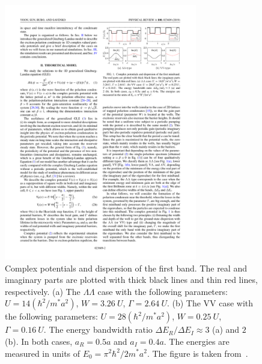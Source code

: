 %
%
%
\begin{figure}[ht]
\centering
\includegraphics[width=0.75\textwidth]{Fig/Ch4/fig1.pdf}
\caption[Setup of 1D complex potentials and corresponding eigenvalues]{Complex potentials and dispersion of the first band. The real and imaginary parts are plotted with thick black lines and thin red lines, respectively. (a) The $\Lambda\Lambda$ case with the following parameters: $U = 14(\hbar^2/m^* a^2)$, $W = 3.26~U$, $\Gamma=2.64~U$. (b) The VV case with the following parameters: $U=28(\hbar^2/m^* a^2)$, $W=0.25~U$, $\Gamma= 0.16~U$. The energy bandwidth ratio ${\Delta}E_R/{\Delta}E_I \approx 3$ (a) and $2$ (b). In both cases, $a_R = 0.5a$  and $a_I = 0.4a$. The energies are measured in units of $E_0=\pi^2\hbar^2/2m^*a^2$. The figure is taken from~\cite{Yoon:2019aa}.}
\label{CH4_fig:1-1}
\end{figure}
%
%
%


